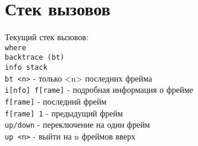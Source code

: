 \section{Стек вызовов}

\noindent Текущий стек вызовов: \\
\indent \texttt{where} \\
\indent \texttt{backtrace (bt)} \\
\indent \texttt{info stack} \\

\noindent \texttt{bt <n>} - только <n> последних фрейма \\
\noindent \texttt{i[nfo] f[rame]} - подробная информация о фрейме \\
\noindent \texttt{f[rame]} - последний фрейм \\
\noindent \texttt{f[rame] 1} - предыдущий фрейм \\
\noindent \texttt{up/down} - переключение на один фрейм \\
\noindent \texttt{up <n>} - выйти на n фреймов вверх


